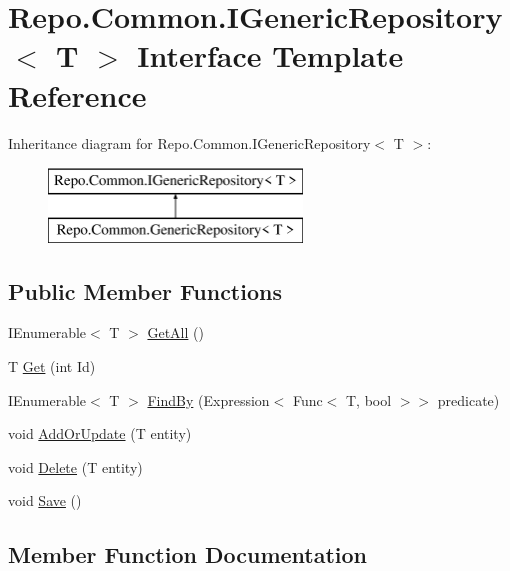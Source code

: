 \hypertarget{interface_repo_1_1_common_1_1_i_generic_repository}{}\section{Repo.\+Common.\+I\+Generic\+Repository$<$ T $>$ Interface Template Reference}
\label{interface_repo_1_1_common_1_1_i_generic_repository}
Inheritance diagram for Repo.\+Common.\+I\+Generic\+Repository$<$ T $>$\+:\begin{figure}[H]
\begin{center}
\leavevmode
\includegraphics[height=2.000000cm]{interface_repo_1_1_common_1_1_i_generic_repository}
\end{center}
\end{figure}
\subsection*{Public Member Functions}
\begin{DoxyCompactItemize}
\item 
I\+Enumerable$<$ T $>$ \hyperlink{interface_repo_1_1_common_1_1_i_generic_repository_a1ca337e6dced734d843e6955bc997ed0}{Get\+All} ()
\item 
T \hyperlink{interface_repo_1_1_common_1_1_i_generic_repository_acd283f18d8c2a73c52fa49601346e51d}{Get} (int Id)
\item 
I\+Enumerable$<$ T $>$ \hyperlink{interface_repo_1_1_common_1_1_i_generic_repository_a4335770c876a0343a68d6a38f57f67ad}{Find\+By} (Expression$<$ Func$<$ T, bool $>$$>$ predicate)
\item 
void \hyperlink{interface_repo_1_1_common_1_1_i_generic_repository_aaba8a577e9c5b3ae8e86b03b1d94b0f8}{Add\+Or\+Update} (T entity)
\item 
void \hyperlink{interface_repo_1_1_common_1_1_i_generic_repository_a20e38f766023a37a974d33b9b5bffd72}{Delete} (T entity)
\item 
void \hyperlink{interface_repo_1_1_common_1_1_i_generic_repository_aff4307598aa9e4115d3baa2067d67647}{Save} ()
\end{DoxyCompactItemize}


\subsection{Member Function Documentation}
\mbox{\label{interface_repo_1_1_common_1_1_i_generic_repository_aaba8a577e9c5b3ae8e86b03b1d94b0f8}} 
